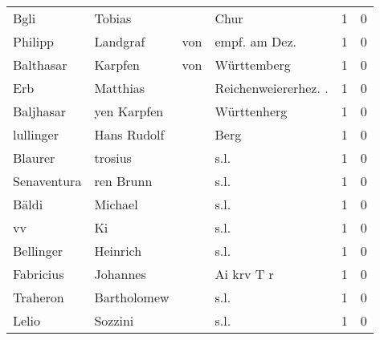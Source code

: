 \begin{center}
\begin{tiny}
\begin{longtabu}{llllrr}
                     Bgli &                             Tobias &             &                                        Chur &          1 &         0 \\
                  Philipp &                           Landgraf &         von &                              empf. am Dez.  &          1 &         0 \\
                Balthasar &                            Karpfen &         von &                                 Württemberg &          1 &         0 \\
                      Erb &                           Matthias &             &                       Reichenweiererhez. .  &          1 &         0 \\
                Baljhasar &                        yen Karpfen &             &                                 Württenherg &          1 &         0 \\
                lullinger &                        Hans Rudolf &             &                                        Berg &          1 &         0 \\
                  Blaurer &                            trosius &             &                                        s.l. &          1 &         0 \\
              Senaventura &                          ren Brunn &             &                                        s.l. &          1 &         0 \\
                    Bäldi &                            Michael &             &                                        s.l. &          1 &         0 \\
                       vv &                                 Ki &             &                                        s.l. &          1 &         0 \\
                Bellinger &                           Heinrich &             &                                        s.l. &          1 &         0 \\
                Fabricius &                           Johannes &             &                                  Ai krv T r &          1 &         0 \\
                 Traheron &                        Bartholomew &             &                                        s.l. &          1 &         0 \\
                    Lelio &                            Sozzini &             &                                        s.l. &          1 &         0 \\

\end{longtabu}
\end{tiny}
\end{center}
